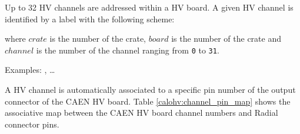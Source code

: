\vskip 10pt \par\noindent Up to 32  HV channels are addressed within a
HV  board.  A  given HV  channel  is identified  by a  label with  the
following scheme:
\begin{center}
 \end{center}
where \texttt{$crate$} is the number of the crate, \texttt{$board$} is
the number  of the crate and  \texttt{$channel$} is the number  of the
channel  ranging   from  \texttt{0}  to   \texttt{31}.
\vskip 10pt\par\noindent
Examples: , \dots {}

\vskip 10pt A HV channel is automatically associated to a specific pin
number  of  the  output  connector   of  the  CAEN  HV  board.   Table
\ref{calohv:channel_pin_map}  shows the  associative  map between  the
CAEN HV board channel numbers and Radial connector pins.

